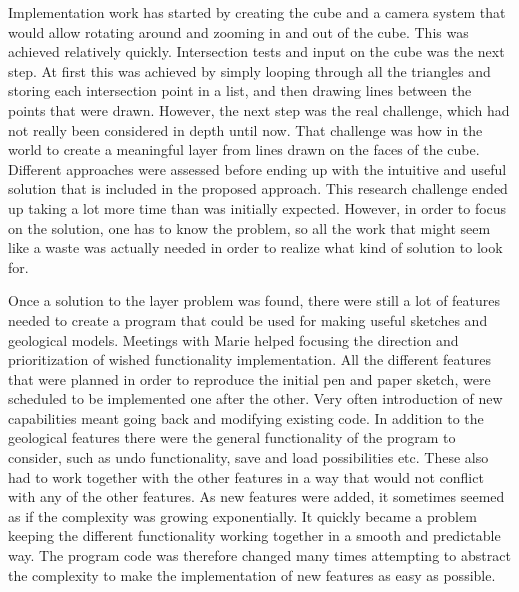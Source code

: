 \documentclass[a4paper,12pt]{report}
\begin{document}
Implementation work has started by creating the cube and a camera system that would allow rotating around and zooming in and out of the cube. This was achieved relatively quickly. Intersection tests and input on the cube was the next step. At first this was achieved by simply looping through all the triangles and storing each intersection point in a list, and then drawing lines between the points that were drawn. However, the next step was the real challenge, which had not really been considered in depth until now. That challenge was how in the world to create a meaningful layer from lines drawn on the faces of the cube. Different approaches were assessed before ending up with the intuitive and useful solution that is included in the proposed approach. This research challenge ended up taking a lot more time than was initially expected. However, in order to focus on the solution, one has to know the problem, so all the work that might seem like a waste was actually needed in order to realize what kind of solution to look for.

Once a solution to the layer problem was found, there were still a lot of features needed to create a program that could be used for making useful sketches and geological models. Meetings with Marie helped focusing the direction and prioritization of wished functionality implementation. All the different features that were planned in order to reproduce the initial pen and paper sketch, were scheduled to be implemented one after the other. Very often introduction of new capabilities meant going back and modifying existing code. In addition to the geological features there were the general functionality of the program to consider, such as undo functionality, save and load possibilities etc. These also had to work together with the other features in a way that would not conflict with any of the other features. As new features were added, it sometimes seemed as if the complexity was growing exponentially. It quickly became a problem keeping the different functionality working together in a smooth and predictable way. The program code was therefore changed many times attempting to abstract the complexity to make the implementation of new features as easy as possible.
\end{document}
